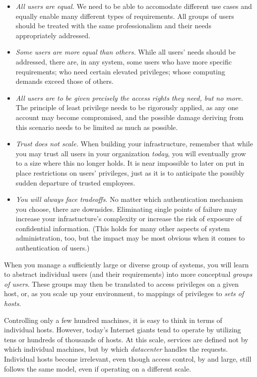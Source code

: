 \begin{itemize}
	\item {\em All users are equal.}  We need to be able to
		accomodate different use cases and equally enable many
		different types of requirements.  All groups of users
		should be treated with the same professionalism and their
		needs appropriately addressed.
	\item {\em Some users are more equal than others.}  While all
		users' needs should be addressed, there are, in any
		system, some users who have more specific requirements;
		who need certain elevated privileges; whose computing
		demands exceed those of others.
	\item {\em All users are to be given precisely the access rights
		they need, but no more.}  The principle of least privilege
		needs to be rigorously applied, as any one account may
		become compromised, and the possible damage deriving from
		this scenario needs to be limited as much as possible.
	\item {\em Trust does not scale.}  When building your
		infrastructure, remember that while you may trust all
		users in your organization {\em today}, you will
		eventually grow to a size where this no longer holds.  It
		is near impossible to later on put in place restrictions
		on users' privileges, just as it is to anticipate the
		possibly sudden departure of trusted employees.
	\item {\em You will always face tradeoffs.}  No matter which
		authentication mechanism you choose, there are downsides.
		Eliminating single points of failure may increase your
		infrastucture's complexity or increase the risk of
		exposure of confidential information.  (This holds for
		many other aspects of system administration, too, but the
		impact may be most obvious when it comes to
		authentication of users.)
\end{itemize}

When you manage a sufficiently large or diverse group
of systems, you will learn to abstract individual
users (and their requirements) into more conceptual
{\em groups of users}.  These groups may then be
translated to access privileges on a given host, or,
as you scale up your environment, to mappings of
privileges to {\em sets of hosts}.

Controlling only a few hundred machines, it is easy to
think in terms of individual hosts.  However, today's
Internet giants tend to operate by utilizing tens or
hundreds of thousands of hosts.  At this scale,
services are defined not by which individual machines,
but by which {\em datacenter} handles the requests.
Individual hosts become irrelevant, even though access
control, by and large, still follows the same model,
even if operating on a different scale.

